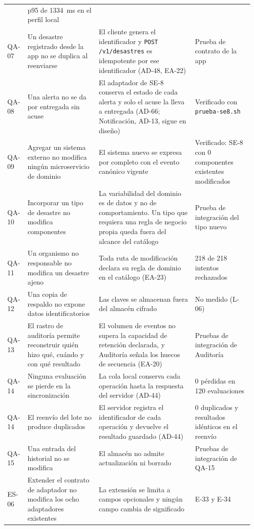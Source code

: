 \documentclass[11pt,letterpaper]{article}
\begin{document}
\begin{longtable}{L{1.9cm} L{5.2cm} L{5.2cm} L{3.3cm}}
& p95 de \qty{1334}{\milli\second} en el perfil local \\
QA-07 & Un desastre registrado desde la app no se duplica al reenviarse & El cliente genera el
identificador y \texttt{POST /v1/desastres} es idempotente por ese identificador (AD-48, EA-22) &
Prueba de contrato de la app \\
QA-08 & Una alerta no se da por entregada sin acuse & El adaptador de SE-8 conserva el estado de
cada alerta y solo el acuse la lleva a entregada (AD-66; Notificación, AD-13, sigue en diseño) &
Verificado con \texttt{prueba-se8.sh} \\
QA-09 & Agregar un sistema externo no modifica ningún microservicio de dominio & El sistema nuevo se
expresa por completo con el evento canónico vigente & Verificado: SE-8 con 0 componentes existentes
modificados \\
QA-10 & Incorporar un tipo de desastre no modifica componentes & La variabilidad del dominio es de
datos y no de comportamiento. Un tipo que requiera una regla de negocio propia queda fuera del
alcance del catálogo & Prueba de integración del tipo nuevo \\
QA-11 & Un organismo no responsable no modifica un desastre ajeno & Toda ruta de modificación
declara su regla de dominio en el catálogo (EA-23) & 218 de 218 intentos rechazados \\
QA-12 & Una copia de respaldo no expone datos identificatorios & Las claves se almacenan fuera del
almacén cifrado & No medido (L-06) \\
QA-13 & El rastro de auditoría permite reconstruir quién hizo qué, cuándo y con qué resultado & El
volumen de eventos no supera la capacidad de retención declarada, y Auditoría señala los huecos de
secuencia (EA-20) & Pruebas de integración de Auditoría \\
QA-14 & Ninguna evaluación se pierde en la sincronización & La cola local conserva cada operación
hasta la respuesta del servidor (AD-44) & 0 pérdidas en 120 evaluaciones \\
QA-14 & El reenvío del lote no produce duplicados & El servidor registra el identificador de cada
operación y devuelve el resultado guardado (AD-44) & 0 duplicados y resultados idénticos en el
reenvío \\
QA-15 & Una entrada del historial no se modifica & El almacén no admite actualización ni borrado &
Pruebas de integración de QA-15 \\
ES-06 & Extender el contrato de adaptador no modifica los ocho adaptadores existentes & La
extensión se limita a campos opcionales y ningún campo cambia de significado & E-33 y E-34 \\
\end{longtable}
\end{document}
